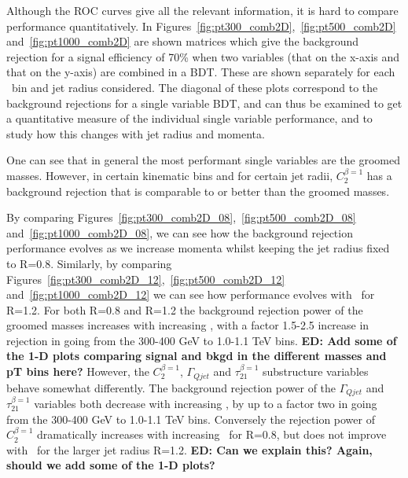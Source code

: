 Although the ROC curves give all the relevant information, it is hard
to compare performance quantitatively. In
Figures~\ref{fig:pt300_comb2D},~\ref{fig:pt500_comb2D}
and~\ref{fig:pt1000_comb2D} are shown matrices which give the
background rejection for a signal efficiency of 70\% when two
variables (that on the x-axis and that on the y-axis) are combined in
a BDT. These are shown separately for each \pt~bin and jet radius
considered. The diagonal of these plots correspond to the background
rejections for a single variable BDT, and can thus be examined to get a
quantitative measure of the individual single variable performance,
and to study how this changes with jet radius and momenta.

One can see that in general the most performant single variables are
the groomed masses. However, in certain kinematic bins and for certain
jet radii, $C_2^{\beta=1}$ has a background rejection that is
comparable to or better than the groomed masses. 

By comparing
Figures~\ref{fig:pt300_comb2D_08},~\ref{fig:pt500_comb2D_08}
and~\ref{fig:pt1000_comb2D_08}, we can see how the background
rejection performance evolves as we increase momenta whilst keeping the jet
radius fixed to R=0.8. Similarly, by comparing Figures~\ref{fig:pt300_comb2D_12},~\ref{fig:pt500_comb2D_12}
and~\ref{fig:pt1000_comb2D_12} we can see how performance evolves with
\pt~for R=1.2. For both R=0.8 and R=1.2 the background rejection power of
the groomed masses increases with increasing \pt, with a factor 1.5-2.5 increase in rejection in going from the 300-400 GeV to
1.0-1.1 TeV bins. {\bf ED: Add some of the 1-D plots comparing signal and bkgd
  in the different masses and pT bins here?} However, the $C_2^{\beta=1}$, $\Gamma_{Qjet}$ and
$\tau_{21}^{\beta=1}$ substructure variables behave somewhat
differently. The background rejection power of the $\Gamma_{Qjet}$ and
$\tau_{21}^{\beta=1}$ variables both decrease with increasing \pt, by
up to a factor two in going from the 300-400 GeV to
1.0-1.1 TeV bins. Conversely the rejection power of $C_2^{\beta=1}$
dramatically increases with increasing \pt~for R=0.8, but does not
improve with \pt~for the larger jet radius R=1.2. {\bf ED: Can we
  explain this? Again, should we add some of the 1-D plots?}

